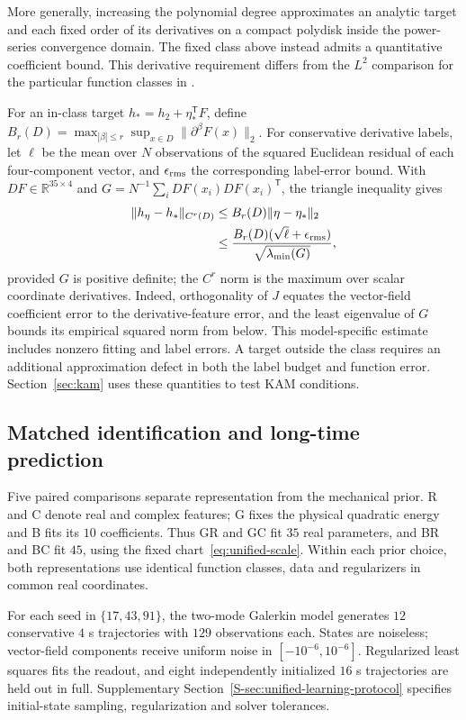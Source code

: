 More generally, increasing the polynomial degree approximates an
analytic target and each fixed order of its derivatives on a compact
polydisk inside the power-series convergence domain. The fixed class
above instead admits a quantitative coefficient bound. This derivative
requirement differs from the $L^2$ comparison for the particular
function classes in \citet[Theorem~2]{zhang}.

For an in-class target $h_*=h_2+\eta_*^{\mathsf T}F$, define
$B_r(D)=\max_{|\beta|\le r}\sup_{x\in D}\|\partial^\beta F(x)\|_2$.
For conservative derivative labels, let $\ell$ be the mean over $N$
observations of the squared Euclidean residual of each four-component
vector, and $\epsilon_{\rm rms}$ the corresponding label-error bound.
With $DF\in\mathbb R^{35\times4}$ and
$G=N^{-1}\sum_i DF(x_i)DF(x_i)^{\mathsf T}$, the triangle inequality gives
\begin{align}
 \|h_\eta-h_*\|_{C^r(D)}
 &\le B_r(D)\|\eta-\eta_*\|_2\nonumber\\
 &\le \frac{B_r(D)(\sqrt\ell+\epsilon_{\rm rms})}
              {\sqrt{\lambda_{\min}(G)}},
 \label{eq:core-feature-error}
\end{align}
provided $G$ is positive definite; the $C^r$ norm is the maximum over
scalar coordinate derivatives. Indeed, orthogonality of $J$ equates the
vector-field coefficient error to the derivative-feature error, and
the least eigenvalue of $G$ bounds its empirical squared norm from
below. This model-specific estimate includes nonzero fitting and label
errors. A target outside the class requires an additional approximation
defect in both the label budget and function error.
Section~\ref{sec:kam} uses these quantities to test KAM conditions.

\subsection{Matched identification and long-time prediction}
\label{sec:core-learning-comparisons}
Five paired comparisons separate representation from the mechanical
prior. R and C denote real and complex features; G fixes the physical
quadratic energy and B fits its $10$ coefficients. Thus GR and GC fit
$35$ real parameters, and BR and BC fit $45$, using the fixed
chart~\eqref{eq:unified-scale}. Within each prior choice, both
representations use identical function classes, data and regularizers
in common real coordinates.

For each seed in $\{17,43,91\}$, the two-mode Galerkin model generates
$12$ conservative $4$ s trajectories with $129$ observations each.
States are noiseless; vector-field components receive uniform noise
in $[-10^{-6},10^{-6}]$. Regularized least squares fits the readout,
and eight independently initialized $16$ s trajectories are held out
in full. Supplementary Section~\ref{S-sec:unified-learning-protocol}
specifies initial-state sampling, regularization and solver tolerances.

